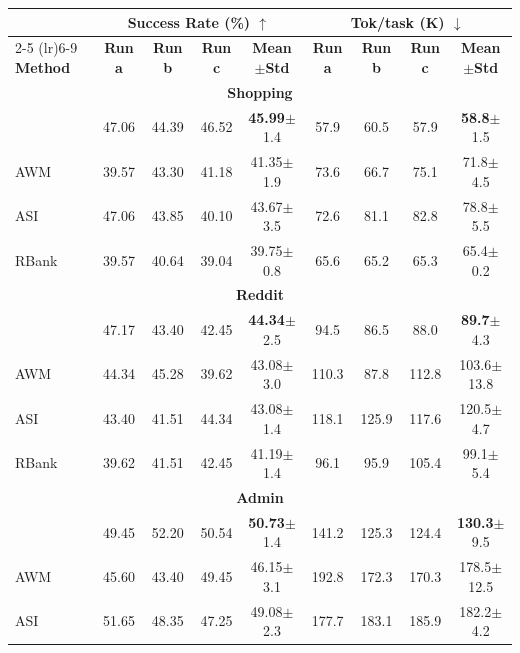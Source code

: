 \begin{table}[ht]
\centering
\small
\begin{tabular}{lcccccccc}
\toprule
& \multicolumn{4}{c}{\textbf{Success Rate (\%) $\uparrow$}} & \multicolumn{4}{c}{\textbf{Tok/task (K) $\downarrow$}} \\
\cmidrule(lr){2-5} \cmidrule(lr){6-9}
\textbf{Method} & \textbf{Run a} & \textbf{Run b} & \textbf{Run c} & \textbf{Mean$\pm$Std} & \textbf{Run a} & \textbf{Run b} & \textbf{Run c} & \textbf{Mean$\pm$Std} \\
\midrule
\multicolumn{9}{c}{\textbf{Shopping}} \\
\midrule
\budgetactor{}      & 47.06 & 44.39 & 46.52 & \textbf{45.99}{\scriptsize $\pm$1.4} & 57.9 & 60.5 & 57.9 & \textbf{58.8}{\scriptsize $\pm$1.5} \\
AWM            & 39.57 & 43.30 & 41.18 & 41.35{\scriptsize $\pm$1.9} & 73.6 & 66.7 & 75.1 & 71.8{\scriptsize $\pm$4.5} \\
ASI            & 47.06 & 43.85 & 40.10 & 43.67{\scriptsize $\pm$3.5} & 72.6 & 81.1 & 82.8 & 78.8{\scriptsize $\pm$5.5} \\
RBank          & 39.57 & 40.64 & 39.04 & 39.75{\scriptsize $\pm$0.8} & 65.6 & 65.2 & 65.3 & 65.4{\scriptsize $\pm$0.2} \\
\midrule
\multicolumn{9}{c}{\textbf{Reddit}} \\
\midrule
\budgetactor{}      & 47.17 & 43.40 & 42.45 & \textbf{44.34}{\scriptsize $\pm$2.5} & 94.5 & 86.5 & 88.0 & \textbf{89.7}{\scriptsize $\pm$4.3} \\
AWM            & 44.34 & 45.28 & 39.62 & 43.08{\scriptsize $\pm$3.0} & 110.3 &  87.8 & 112.8 & 103.6{\scriptsize $\pm$13.8} \\
ASI            & 43.40 & 41.51 & 44.34 & 43.08{\scriptsize $\pm$1.4} & 118.1 & 125.9 & 117.6 & 120.5{\scriptsize $\pm$4.7} \\
RBank          & 39.62 & 41.51 & 42.45 & 41.19{\scriptsize $\pm$1.4} &  96.1 &  95.9 & 105.4 &  99.1{\scriptsize $\pm$5.4} \\
\midrule
\multicolumn{9}{c}{\textbf{Admin}} \\
\midrule
\budgetactor{}      & 49.45 & 52.20 & 50.54 & \textbf{50.73}{\scriptsize $\pm$1.4} & 141.2 & 125.3 & 124.4 & \textbf{130.3}{\scriptsize $\pm$9.5} \\
AWM            & 45.60 & 43.40 & 49.45 & 46.15{\scriptsize $\pm$3.1} & 192.8 & 172.3 & 170.3 & 178.5{\scriptsize $\pm$12.5} \\
ASI            & 51.65 & 48.35 & 47.25 & 49.08{\scriptsize $\pm$2.3} & 177.7 & 183.1 & 185.9 & 182.2{\scriptsize $\pm$4.2} \\

\end{tabular}
\end{table}
